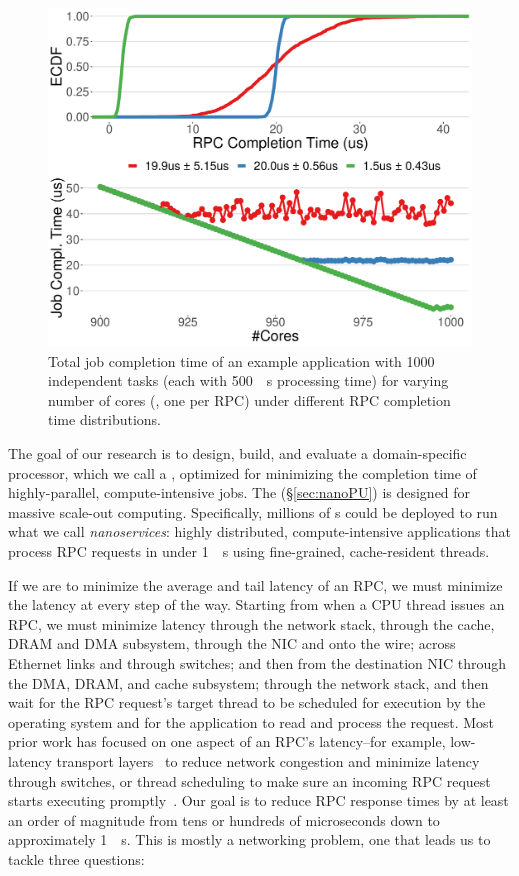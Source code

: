 \begin{figure}
  \includegraphics[width=0.9\linewidth]{./figures/nano-comptime}
  \caption{Total job completion time of an example application with 1000 independent tasks (each with \SI{500}{\mu s} processing time) for varying number of cores (\ie, one per RPC) under different RPC completion time distributions.}
  \label{fig:nanoservice-sim}
\end{figure}

The goal of our research is to design, build, and evaluate a domain-specific processor, which we call a {\em \name{}}, optimized for minimizing the completion time of highly-parallel, compute-intensive jobs. The \name{} (\S\ref{sec:nanoPU}) is designed for massive scale-out computing. 
Specifically, millions of \name{}s could be deployed to run what we call {\em nanoservices}: highly distributed, compute-intensive applications that process RPC requests in under \SI{1}{\mu s} using fine-grained, cache-resident threads.

If we are to minimize the average and tail latency of an RPC, we must minimize the latency at every step of the way. 
Starting from when a CPU thread issues an RPC, we must minimize latency through the network stack, through the cache, DRAM and DMA subsystem, through the NIC and onto the wire; across Ethernet links and through switches; and then from the destination NIC through the DMA, DRAM, and cache subsystem; through the network stack, and then wait for the RPC request's target thread to be scheduled for execution by the operating system and for the application to read and process the request.
Most prior work has focused on one aspect of an RPC's latency--for example, low-latency transport layers~\cite{homa, ndp, pfabric} to reduce network congestion and minimize latency through switches, or thread scheduling to make sure an incoming RPC request starts executing promptly~\cite{shinjuku, shenango}. 
Our goal is to reduce RPC response times by at least an order of magnitude from tens or hundreds of microseconds down to approximately \SI{1}{\mu s}. 
This is mostly a networking problem, one that leads us to tackle three questions:

